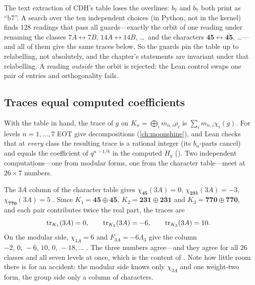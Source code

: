 \begin{pitfallbox}
The text extraction of CDH's table loses the overlines: $b_7$ and $\overline{b_7}$ both
print as ``b7''. A search over the ten independent choices (in Python, not in the kernel)
finds $128$ readings that pass all guards---exactly the orbit of one reading under
renaming the classes $7A\leftrightarrow7B$, $14A\leftrightarrow14B$, \dots\ and the
characters $\mathbf{45}\leftrightarrow\overline{\mathbf{45}}$, \dots---and all of them give
the same traces below. So the guards pin the table up to relabelling, not absolutely, and
the chapter's statements are invariant under that relabelling. A reading \emph{outside}
the orbit is rejected: the Lean control  swaps one pair of
entries and orthogonality fails.
\end{pitfallbox}

\subsection{Traces equal computed coefficients}

With the table in hand, the trace of $g$ on $K_n=\bigoplus_im_{n,i}\rho_i$ is
$\sum_im_{n,i}\chi_i(g)$. For levels $n=1,\dots,7$ EOT give decompositions
(\cref{ch:moonshine}), and Lean checks that at \emph{every} class the resulting trace is a
rational integer (its $b_n$-parts cancel) and equals the coefficient of $q^{n-1/8}$ in the
computed $H_g$ (\TA). Two independent computations---one from modular forms, one from
the character table---meet at $26\times7$ numbers.

\begin{example}
The $3A$ column of the character table gives $\chi_{\mathbf{45}}(3A)=0$,
$\chi_{\mathbf{231}}(3A)=-3$, $\chi_{\mathbf{770}}(3A)=5$ . Since $K_1=\mathbf{45}\oplus\overline{\mathbf{45}}$,
$K_2=\mathbf{231}\oplus\overline{\mathbf{231}}$ and
$K_3=\mathbf{770}\oplus\overline{\mathbf{770}}$, and each pair contributes twice the real
part, the traces are
\[
  \operatorname{tr}_{K_1}(3A)=0,\qquad \operatorname{tr}_{K_2}(3A)=-6,\qquad \operatorname{tr}_{K_3}(3A)=10 .
\]
On the modular side, $\chi_{3A}=6$ and $F_{3A}=-6\Lambda_3$  give the column $-2,\,0,\,-6,\,10,\,0,\,-18,\dots$
. The three numbers agree---and they agree for all
$26$ classes and all seven levels at once, which is the content of
. Note how little room there is for an accident: the
modular side knows only $\chi_{3A}$ and one weight-two form, the group side only a column
of characters.
\end{example}

